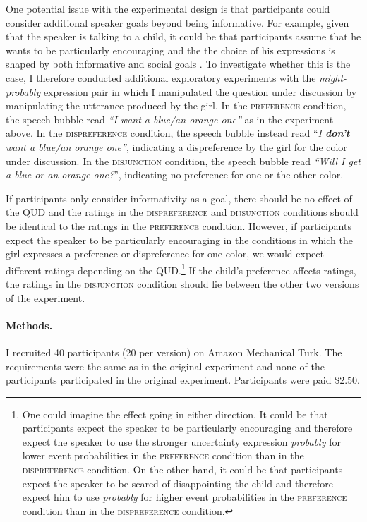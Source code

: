 One potential issue with the experimental design is that participants could consider additional speaker goals
beyond being informative. For example, given that the speaker is talking to a child, it could be that participants
assume that he wants to be particularly encouraging and the the choice of his expressions is shaped by both informative
and social goals \cite{Yoon2018}. To investigate whether this is the case, I therefore conducted additional exploratory experiments with
the \emph{might-probably} expression pair in which I manipulated the question under discussion \parencite[QUD;][]{Roberts2012} by manipulating 
the utterance produced by the girl. In the \textsc{preference} condition, the speech bubble read \emph{``I want a blue/an orange one''} as in the experiment
above. In the \textsc{dispreference} condition, the speech bubble instead read ``\emph{I \textbf{don't} want a blue/an orange one''}, indicating
a dispreference by the girl for the color under discussion. In the \textsc{disjunction} condition, the speech bubble read 
\emph{``Will I get a blue or an orange one?}'', indicating no preference for one or the other color. 

If participants only consider informativity as a goal, there should be no effect of the QUD and the ratings in the 
\textsc{dispreference} and \textsc{dijsunction} conditions should be identical to the ratings 
in the \textsc{preference} condition. However, if participants expect the speaker to be particularly encouraging in the 
conditions in which the girl expresses a preference or dispreference for one color, we would expect different
ratings depending on the QUD.\footnote{One could imagine the effect going in either direction. It could be that
participants expect the speaker to be particularly encouraging and therefore expect the speaker to use 
the stronger uncertainty expression \textit{probably} for lower event probabilities in the \textsc{preference} condition than 
in the \textsc{dispreference} condition. On the other hand, it could be that participants expect the speaker to be scared 
of disappointing the child and therefore expect him to use \textit{probably} for higher event probabilities in the \textsc{preference} 
condition than in the \textsc{dispreference} condition.} If the child's preference affects ratings, the ratings in the  
\textsc{disjunction} condition should lie between the other two versions of the experiment.

\paragraph{Methods.} I recruited 40 participants (20 per version) on Amazon Mechanical Turk. 
The requirements were the same as in the original experiment and none of the participants 
participated in the original experiment. Participants were paid  \$2.50.

